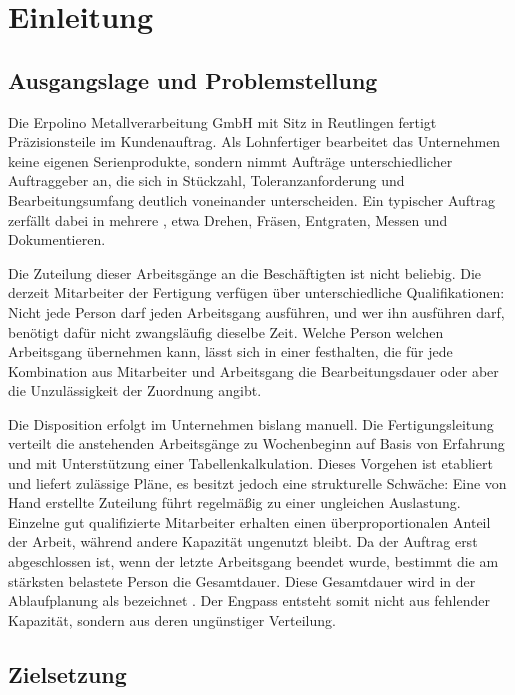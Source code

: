 \chapter{Einleitung}
\label{kap:einleitung}

\section{Ausgangslage und Problemstellung}
\label{sec:ausgangslage}

Die Erpolino Metallverarbeitung GmbH mit Sitz in Reutlingen fertigt Präzisionsteile
im Kundenauftrag. Als Lohnfertiger bearbeitet das Unternehmen keine eigenen
Serienprodukte, sondern nimmt Aufträge unterschiedlicher Auftraggeber an, die sich
in Stückzahl, Toleranzanforderung und Bearbeitungsumfang deutlich voneinander
unterscheiden. Ein typischer Auftrag zerfällt dabei in mehrere ,
etwa Drehen, Fräsen, Entgraten, Messen und Dokumentieren.

Die Zuteilung dieser Arbeitsgänge an die Beschäftigten ist nicht beliebig. Die
derzeit \ZahlMitarbeiter{} Mitarbeiter der Fertigung verfügen über unterschiedliche
Qualifikationen: Nicht jede Person darf jeden Arbeitsgang ausführen, und wer ihn
ausführen darf, benötigt dafür nicht zwangsläufig dieselbe Zeit. Welche Person
welchen Arbeitsgang übernehmen kann, lässt sich in einer 
festhalten, die für jede Kombination aus Mitarbeiter und Arbeitsgang die
Bearbeitungsdauer oder aber die Unzulässigkeit der Zuordnung angibt.

Die Disposition erfolgt im Unternehmen bislang manuell. Die Fertigungsleitung
verteilt die anstehenden Arbeitsgänge zu Wochenbeginn auf Basis von Erfahrung und
mit Unterstützung einer Tabellenkalkulation. Dieses Vorgehen ist etabliert und
liefert zulässige Pläne, es besitzt jedoch eine strukturelle Schwäche: Eine von
Hand erstellte Zuteilung führt regelmäßig zu einer ungleichen Auslastung. Einzelne
gut qualifizierte Mitarbeiter erhalten einen überproportionalen Anteil der Arbeit,
während andere Kapazität ungenutzt bleibt. Da der Auftrag erst abgeschlossen ist,
wenn der letzte Arbeitsgang beendet wurde, bestimmt die am stärksten belastete
Person die Gesamtdauer. Diese Gesamtdauer wird in der Ablaufplanung als
 bezeichnet \parencite{pinedo2016scheduling}. Der Engpass entsteht
somit nicht aus fehlender Kapazität, sondern aus deren ungünstiger Verteilung.

\section{Zielsetzung}
\label{sec:zielsetzung}

